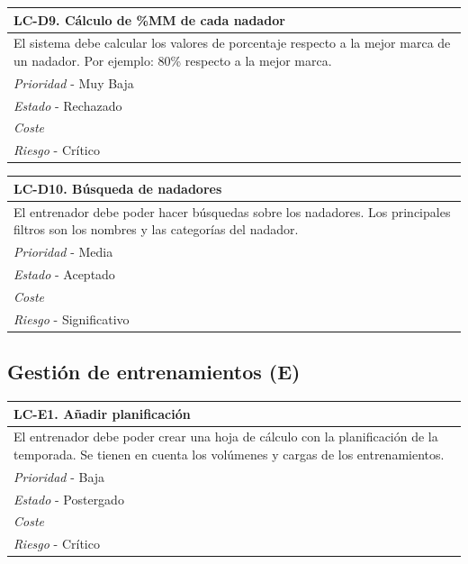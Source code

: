 	\begin{center}
		\begin{tabularx}{15cm}{|X|}
			\hline 
				\bf{LC-D9. Cálculo de \%MM de cada nadador}\\
			\hline
				El sistema debe calcular los valores de porcentaje respecto a la mejor marca de un nadador. Por ejemplo: 80\% respecto a la mejor marca.\\
			\hline
				{\it Prioridad} - Muy Baja\\
			\hline
				{\it Estado} - Rechazado\\
			\hline
				{\it Coste}\\
			\hline
				{\it Riesgo} - Crítico\\
			\hline
		\end{tabularx}
	\end{center}
	
	\begin{center}
		\begin{tabularx}{15cm}{|X|}
			\hline 
				\bf{LC-D10. Búsqueda de nadadores}\\
			\hline
				El entrenador debe poder hacer búsquedas sobre los nadadores. Los principales filtros son los nombres y las categorías del nadador.\\
			\hline
				{\it Prioridad} - Media\\
			\hline
				{\it Estado} - Aceptado\\
			\hline
				{\it Coste}\\
			\hline
				{\it Riesgo} - Significativo\\
			\hline
		\end{tabularx}
	\end{center}
	

%
%
\subsection{Gestión de entrenamientos (E)} %
	\label{sub:gestion_de_entrenamientos}

	\begin{center}
		\begin{tabularx}{15cm}{|X|}
			\hline 
				\bf{LC-E1. Añadir planificación}\\
			\hline
				El entrenador debe poder crear una hoja de cálculo con la planificación de la temporada. Se tienen en cuenta los volúmenes y cargas de los entrenamientos.\\
			\hline
				{\it Prioridad} - Baja\\
			\hline
				{\it Estado} - Postergado\\
			\hline
				{\it Coste}\\
			\hline
				{\it Riesgo} - Crítico\\
			\hline
		\end{tabularx}
	\end{center}
	
